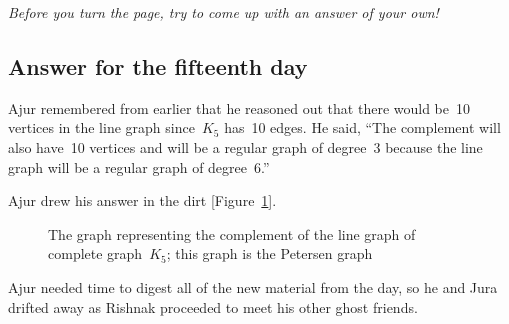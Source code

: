 \textit{Before you turn the page, try to come up with an answer of your own!}

\newpage
\subsection*{Answer for the fifteenth day}
Ajur remembered from earlier that he reasoned out that there would be~10 vertices in the line graph since~$K_5$ has~10 edges. He said, ``The complement will also have~10 vertices and will be a regular graph of degree~3 because the line graph will be a regular graph of degree~6.''

Ajur drew his answer in the dirt [Figure~\ref{15ga1}].

\begin{figure}
\begin{center}
\caption{The graph representing the complement of the line graph of complete graph~$K_5$; this graph is the Petersen graph}\label{15ga1}
\end{center}
\end{figure}

Ajur needed time to digest all of the new material from the day, so he and Jura drifted away as Rishnak proceeded to meet his other ghost friends.
